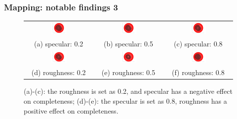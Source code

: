 \documentclass{beamer}
\begin{document}
\begin{frame}
\frametitle{Mapping: notable findings 3}

\begin{figure}[!htbp]
\centering
\begin{tabular}{ccc}
\includegraphics[width=0.25\textwidth]{mapping/sl_spec_rough/sl_00050202}&
\includegraphics[width=0.25\textwidth]{mapping/sl_spec_rough/sl_00050502}&
\includegraphics[width=0.25\textwidth]{mapping/sl_spec_rough/sl_00050802}\\
(a) specular: 0.2 & (b) specular: 0.5 & (c) specular: 0.8\\
\includegraphics[width=0.25\textwidth]{mapping/sl_spec_rough/sl_00050802}&
\includegraphics[width=0.25\textwidth]{mapping/sl_spec_rough/sl_00050805}&
\includegraphics[width=0.25\textwidth]{mapping/sl_spec_rough/sl_00050808}\\
(d) roughness: 0.2 & (e) roughness: 0.5 & (f) roughness: 0.8\\
\end{tabular}
\caption{(a)-(c): the roughness is set as 0.2, and specular has a negative effect on completeness; (d)-(e): the specular is set as 0.8, roughness has a positive effect on completeness.}
\end{figure}

\end{frame}
\end{document}
